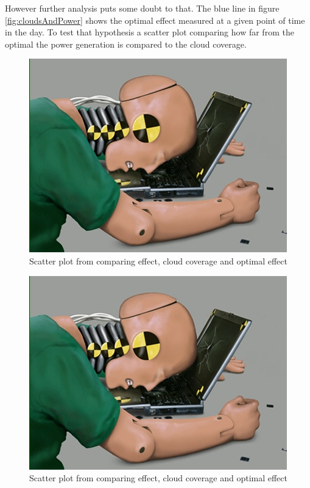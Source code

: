 However further analysis puts some doubt to that.  The blue line in
figure \ref{fig:cloudsAndPower} shows the optimal effect measured at a
given point of time in the day.  To test that hypothesis a scatter
plot comparing how far from the optimal the power generation is
compared to the cloud coverage.

\begin{figure}[h]
  \centering
  \includegraphics{dummy.jpg}
  \caption{Scatter plot from comparing effect, cloud coverage and
    optimal effect}
  \label{fig:scatter30}
\end{figure}

\begin{figure}[h]
  \centering
  \includegraphics{dummy.jpg}
  \caption{Scatter plot from comparing effect, cloud coverage and
    optimal effect}
  \label{fig:scatter60}
\end{figure}


